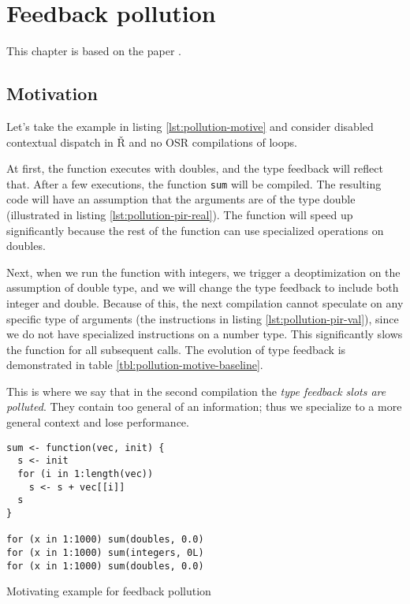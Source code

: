 \chapter{Feedback pollution}

\begin{chapterabstract}
	\todoadd
\end{chapterabstract}

This chapter is based on the paper \todocite.

\section{Motivation}

Let's take the example in listing \ref{lst:pollution-motive} and consider disabled contextual dispatch in Ř and no OSR compilations of loops.

At first, the function executes with doubles, and the type feedback will reflect that. After a few executions, the function \texttt{sum} will be compiled. The resulting code will have an assumption that the arguments are of the type double (illustrated in listing \ref{lst:pollution-pir-real}). The function will speed up significantly because the rest of the function can use specialized operations on doubles.

Next, when we run the function with integers, we trigger a deoptimization on the assumption of double type, and we will change the type feedback to include both integer and double. Because of this, the next compilation cannot speculate on any specific type of arguments (the instructions in listing \ref{lst:pollution-pir-val}), since we do not have specialized instructions on a number type. This significantly slows the function for all subsequent calls. The evolution of type feedback is demonstrated in table \ref{tbl:pollution-motive-baseline}.

This is where we say that in the second compilation the \textit{type feedback slots are polluted}. They contain too general of an information; thus we specialize to a more general context and lose performance.

\begin{listing}
	\begin{verbatim}
sum <- function(vec, init) {
  s <- init
  for (i in 1:length(vec))
    s <- s + vec[[i]]
  s
}

for (x in 1:1000) sum(doubles, 0.0)
for (x in 1:1000) sum(integers, 0L)
for (x in 1:1000) sum(doubles, 0.0)
  \end{verbatim}
	\caption{Motivating example for feedback pollution}\label{lst:pollution-motive}
\end{listing}

